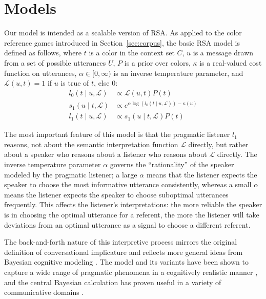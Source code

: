 \documentclass[11pt,letterpaper]{article}
\newcommand{\utt}{u}
\newcommand{\context}{C}
\newcommand{\target}{t}
\renewcommand{\|}{\mid}
\newcommand{\secref}[1]{Section~\ref{#1}}
\begin{document}
\section{Models}

\newcommand{\Lex}{\mathcal{L}}
\newcommand{\Costs}{\kappa}
\newcommand{\Messages}{U}
\newcommand{\targetPrior}{P}

Our model is intended as a scalable version of RSA.  As applied to the
color reference games introduced in \secref{sec:corpus}, the basic RSA
model is defined as follows, where $\target$ is a color in the context
set $\context$, $\utt$ is a message drawn from a set of possible
utterances $\Messages$, $\targetPrior$ is a prior over colors,
$\Costs$ is a real-valued cost function on utterances,
$\alpha \in [0,\infty)$ is an inverse temperature parameter, and
$\Lex(\utt, \target) = 1$ if $\utt$ is true of $\target$, else $0$:
%
\begin{align}
  l_{0}(\target \| \utt, \Lex) 
  &\propto 
  \Lex(\utt, \target) \targetPrior(\target) 
  \\
  s_{1}(\utt \| \target, \Lex)
  &\propto 
  e^{\alpha\log(l_{0}(\target \| \utt, \Lex)) - \Costs(\utt)} 
  \label{eq:rsa-s1}\\
  l_{1}(\target \| \utt, \Lex) 
  &\propto 
  s_{1}(\utt \| \target, \Lex) \targetPrior(\target) 
  \label{eq:rsa-l1}
\end{align}

The most important feature of this model is that the pragmatic
listener $l_{1}$ reasons, not about the semantic interpretation
function $\Lex$ directly, but rather about a speaker who reasons about
a listener who reasons about $\Lex$ directly. The inverse temperature
parameter $\alpha$ governs the ``rationality'' of the speaker modeled
by the pragmatic listener; a large $\alpha$ means that the listener
expects the speaker to choose the most informative utterance
consistently, whereas a small $\alpha$ means the listener expects the
speaker to choose suboptimal utterances frequently. This affects the
listener's interpretations: the more reliable the speaker is in
choosing the optimal utterance for a referent, the more the listener
will take deviations from an optimal utterance as a signal to choose a
different referent.

The back-and-forth nature of this interpretive process mirrors the
original definition of conversational implicature \cite{Grice75} and
reflects more general ideas from Bayesian cognitive modeling
\cite{Tenenbaum-etal:2011}. The model and its variants have been shown
to capture a wide range of pragmatic phenomena in a cognitively
realistic manner
\cite{Goodman2013,Smith:Goodman:Frank:2013,Kao-etal:2014,Bergen:Levy:Goodman:2014},
and the central Bayesian calculation has proven useful in a variety of
communicative domains
\cite{Tellex2014a,Vogel:Potts:Jurafsky:2013}.
\end{document}
